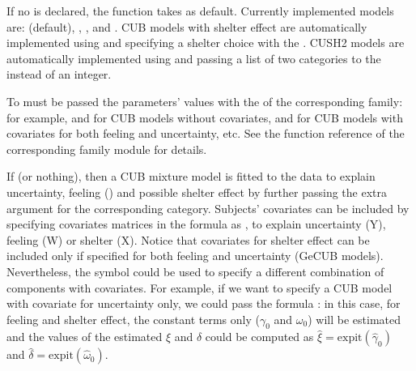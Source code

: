 \documentclass[letterpaper,10pt,english]{sphinxmanual}
\begin{document}
\sphinxAtStartPar
If no  is declared, the function takes  as default.
Currently implemented models are:  (default), , ,
and . CUB models with shelter effect are automatically
implemented using  and specifying a shelter choice with the
 . CUSH2 models are automatically
implemented using  and passing a list of two categories to
the   instead of an integer.

\sphinxAtStartPar
To  must be passed the parameters’ values with the  of the corresponding
family: for example,  and  for CUB models without covariates,  and 
for CUB models with covariates for both feeling and uncertainty, etc. See the
 function reference of the corresponding family module for details.

\sphinxAtStartPar
If   (or nothing), then a CUB mixture model is fitted to the data to explain uncertainty,
feeling () and possible shelter effect by further passing the extra argument  for the corresponding category.
Subjects’ covariates can be included by specifying covariates matrices in the
formula as ,  to explain uncertainty (Y), feeling (W) or shelter (X).
Notice that
covariates for shelter effect can be included only if specified for both feeling and uncertainty (GeCUB models).
Nevertheless, the symbol  could be used to specify a different combination of components with covariates.
For example, if we want to specify a CUB model with covariate  for uncertainty only, we could pass the
formula : in this case, for feeling and shelter effect, the constant terms only
(\(\gamma_0\) and \(\omega_0\)) will be estimated and the values of the estimated \(\xi\) and
\(\delta\) could be computed as \(\hat\xi=\mathrm{expit}(\hat\gamma_0)\) and
\(\hat\delta=\mathrm{expit}(\hat\omega_0)\).
\end{document}
